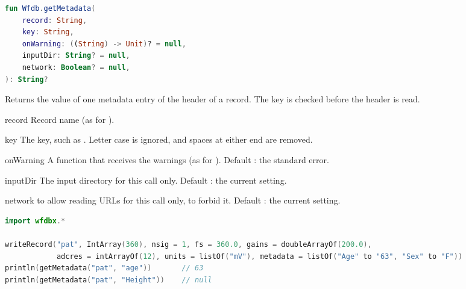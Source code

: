 \begin{lstlisting}[language=Kotlin,style=signature]
fun Wfdb.getMetadata(
    record: String,
    key: String,
    onWarning: ((String) -> Unit)? = null,
    inputDir: String? = null,
    network: Boolean? = null,
): String?
\end{lstlisting}
Returns the value of one metadata entry of the header of a record. The key is checked
before the header is read.
\begin{params}
\item[record] Record name (as for ).
\item[key] The key, such as . Letter case is ignored, and spaces at either end
  are removed.
\item[onWarning] A function that receives the warnings (as for ).
  Default : the standard error.
\item[inputDir] The input directory for this call only. Default : the current
  setting.
\item[network]  to allow reading URLs for this call only,  to
  forbid it. Default : the current setting.
\end{params}
\begin{lstlisting}[language=Kotlin,style=example]
import wfdbx.*

writeRecord("pat", IntArray(360), nsig = 1, fs = 360.0, gains = doubleArrayOf(200.0),
            adcres = intArrayOf(12), units = listOf("mV"), metadata = listOf("Age" to "63", "Sex" to "F"))
println(getMetadata("pat", "age"))       // 63
println(getMetadata("pat", "Height"))    // null
\end{lstlisting}

